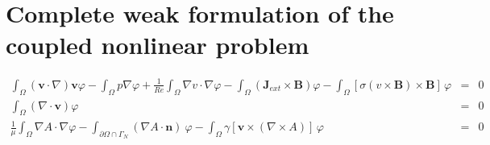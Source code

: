 \documentclass[smallextended]{svjour3}       %
\begin{document}
		\section{Complete weak formulation of the coupled nonlinear problem}
		\begin{eqnarray}
			\int_{\Omega} \left(\mathbf{v} \cdot \nabla\right)\mathbf{v} \varphi
			- \int_{\Omega} p \nabla \varphi
			+ \frac{1}{Re} \int_{\Omega} \nabla v \cdot \nabla \varphi
			- \int_{\Omega} \left(\mathbf{J}_{ext} \times \mathbf{B}\right) \varphi
			- \int_{\Omega} \left[\sigma \left(v \times \mathbf{B}\right) \times \mathbf{B}\right]\, \varphi
			& = & 0
			\\
			\int_{\Omega} \left(\nabla \cdot \mathbf{v}\right) \varphi & = & 0\\
			\frac{1}{\mu}\int_{\Omega}\nabla A \cdot \nabla \varphi - \int_{\partial \Omega \cap \Gamma_{N}} \left(\nabla A\cdot \mathbf{n}\right)\ \varphi 
			 - \int_{\Omega} \gamma \left[\mathbf{v} \times \left( \nabla \times A \right)\right]\,\varphi & = & 0
		\end{eqnarray}
		
\end{document}
